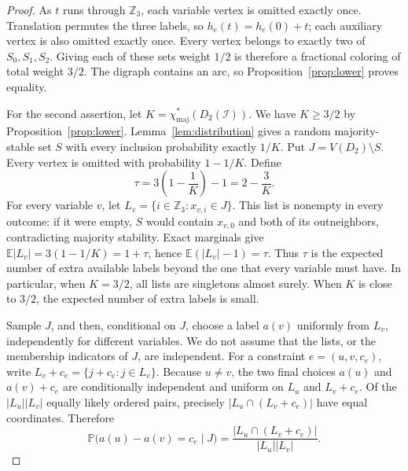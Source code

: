 \documentclass[10pt,a4paper]{article}
\newcommand{\Pp}{\mathbb P}
\newcommand{\E}{\mathbb E}
\newcommand{\chif}{\chi^*_{\mathrm{maj}}}
\newcommand{\abs}[1]{|#1|}
\begin{document}
\begin{proof}
As \(t\) runs through \(\mathbb Z_3\), each variable vertex is omitted exactly once. Translation permutes the three labels, so \(h_e(t)=h_e(0)+t\); each auxiliary vertex is also omitted exactly once. Every vertex belongs to exactly two of \(S_0,S_1,S_2\). Giving each of these sets weight \(1/2\) is therefore a fractional coloring of total weight \(3/2\). The digraph contains an arc, so Proposition~\ref{prop:lower} proves equality.

For the second assertion, let $K=\chif(D_2(\mathcal I))$. We have \(K\ge3/2\) by Proposition~\ref{prop:lower}. Lemma~\ref{lem:distribution} gives a random majority-stable set \(S\) with every inclusion probability exactly \(1/K\). Put \(J=V(D_2)\setminus S\). Every vertex is omitted with probability \(1-1/K\). Define
\begin{equation}\label{eq:tau}
\tau=3\left(1-\frac1K\right)-1=2-\frac3K.
\end{equation}
For every variable \(v\), let \(L_v=\{i\in\mathbb Z_3:x_{v,i}\in J\}\). This list is nonempty in every outcome: if it were empty, \(S\) would contain \(x_{v,0}\) and both of its outneighbors, contradicting majority stability. Exact marginals give \(\E\abs{L_v}=3(1-1/K)=1+\tau\), hence \(\E(\abs{L_v}-1)=\tau\). Thus \(\tau\) is the expected number of extra available labels beyond the one that every variable must have. In particular, when \(K=3/2\), all lists are singletons almost surely. When \(K\) is close to \(3/2\), the expected number of extra labels is small.

Sample \(J\), and then, conditional on \(J\), choose a label \(a(v)\) uniformly from \(L_v\), independently for different variables. We do not assume that the lists, or the membership indicators of \(J\), are independent. For a constraint \(e=(u,v,c_e)\), write \(L_v+c_e=\{j+c_e:j\in L_v\}\). Because \(u\ne v\), the two final choices \(a(u)\) and \(a(v)+c_e\) are conditionally independent and uniform on \(L_u\) and \(L_v+c_e\). Of the \(\abs{L_u}\abs{L_v}\) equally likely ordered pairs, precisely \(\abs{L_u\cap(L_v+c_e)}\) have equal coordinates. Therefore
\begin{equation}\label{eq:listviolation}
\Pp\bigl(a(u)-a(v)=c_e\mid J\bigr)
=\frac{\abs{L_u\cap(L_v+c_e)}}{\abs{L_u}\abs{L_v}}.
\end{equation}


\end{proof}
\end{document}
